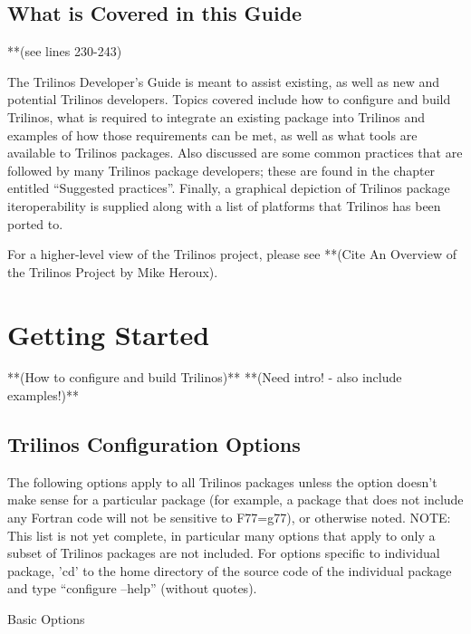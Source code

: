 \documentclass[12pt,relax]{SANDreport}
\begin{document}
	\subsection{What is Covered in this Guide}
**(see lines 230-243)

The Trilinos Developer's Guide is meant to assist existing, as well as new and
potential Trilinos developers.  Topics covered include how to configure and 
build Trilinos, what is required to integrate an existing package into Trilinos
and examples of how those requirements can be met, as well as what tools are 
available to Trilinos packages.  Also discussed are some common practices that 
are followed by many Trilinos package developers; these are found in the 
chapter entitled ``Suggested practices''.  Finally, a graphical depiction of 
Trilinos package iteroperability is supplied along with a list of platforms 
that Trilinos has been ported to.

For a higher-level view of the Trilinos project, please see **(Cite An Overview
of the Trilinos Project by Mike Heroux). 

	\section{Getting Started}
	**(How to configure and build Trilinos)**
	**(Need intro! - also include examples!)**

\subsection{Trilinos Configuration Options}

The following options apply to all Trilinos packages unless 
the option doesn't make sense for a particular package (for example, a 
package that does not include any Fortran code will not be sensitive to 
F77=g77), or otherwise noted.  NOTE: This list is not yet complete, in 
particular many options that apply to only a subset of Trilinos packages 
are not included.  For options specific to individual package, 'cd' to the 
home directory of the source code of the individual package and type 
``configure --help'' (without quotes).

Basic Options
\end{document}
